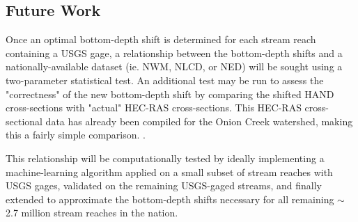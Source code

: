 \documentclass[11pt]{article}
\begin{document}
  \subsection*{Future Work} %

  Once an optimal bottom-depth shift is determined for each stream reach containing a USGS gage, a relationship between the bottom-depth shifts and a nationally-available dataset (ie. NWM, NLCD, or NED) will be sought using a two-parameter statistical test. An additional test may be run to assess the "correctness" of the new bottom-depth shift by comparing the shifted HAND cross-sections with "actual" HEC-RAS cross-sections. This HEC-RAS cross-sectional data has already been compiled for the Onion Creek watershed, making this a fairly simple comparison. \cite{xingms}. 

  This relationship will be computationally tested by ideally implementing a machine-learning algorithm applied on a small subset of stream reaches with USGS gages, validated on the remaining USGS-gaged streams, and finally extended to approximate the bottom-depth shifts necessary for all remaining $\sim$2.7 million stream reaches in the nation.

\printbibliography
\end{document}
